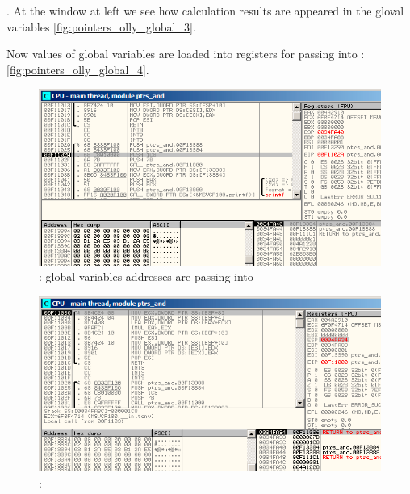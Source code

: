 \ttf.
{At the window at left we see how calculation results are appeared in the gloval variables} 
\figname \ref{fig:pointers_olly_global_3}.

{Now values of global variables are loaded into registers for passing into} \printf:
\figname \ref{fig:pointers_olly_global_4}.

\begin{figure}[H]
\centering
\includegraphics[scale=0.66]{patterns/061_pointers/olly_global1.png}
\caption{\olly: 
{global variables addresses are passing into} \ttf}
\label{fig:pointers_olly_global_1}
\end{figure}

\begin{figure}[H]
\centering
\includegraphics[scale=0.66]{patterns/061_pointers/olly_global2.png}
\caption{\olly: }
\label{fig:pointers_olly_global_2}
\end{figure}

